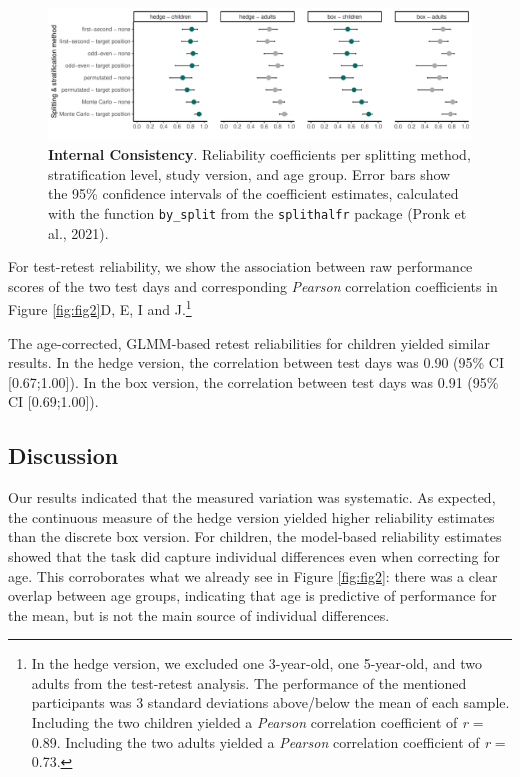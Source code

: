 \documentclass[
  man,floatsintext]{apa6}
\begin{document}
\begin{figure}

{\centering \includegraphics[width=1\linewidth]{../figures/tango_splithalf} 

}

\caption{\textbf{Internal Consistency}. Reliability coefficients per splitting method, stratification level, study version, and age group. Error bars show the 95\% confidence intervals of the coefficient estimates, calculated with the function \texttt{by\_split} from the \texttt{splithalfr} package (Pronk et al., 2021).}\label{fig:fig3}
\end{figure}

For test-retest reliability, we show the association between raw performance scores of the two test days and corresponding \emph{Pearson} correlation coefficients in Figure \ref{fig:fig2}D, E, I and J.\footnote{In the hedge version, we excluded one 3-year-old, one 5-year-old, and two adults from the test-retest analysis.
  The performance of the mentioned participants was 3 standard deviations above/below the mean of each sample.
  Including the two children yielded a \emph{Pearson} correlation coefficient of \emph{r} = 0.89.
  Including the two adults yielded a \emph{Pearson} correlation coefficient of \emph{r} = 0.73.}

The age-corrected, GLMM-based retest reliabilities for children yielded similar results.
In the hedge version, the correlation between test days was 0.90 (95\% CI {[}0.67;1.00{]}).
In the box version, the correlation between test days was 0.91 (95\% CI {[}0.69;1.00{]}).

\hypertarget{discussion-1}{%
\subsection{Discussion}\label{discussion-1}}

Our results indicated that the measured variation was systematic.
As expected, the continuous measure of the hedge version yielded higher reliability estimates than the discrete box version.
For children, the model-based reliability estimates showed that the task did capture individual differences even when correcting for age.
This corroborates what we already see in Figure \ref{fig:fig2}: there was a clear overlap between age groups, indicating that age is predictive of performance for the mean, but is not the main source of individual differences.
\end{document}
